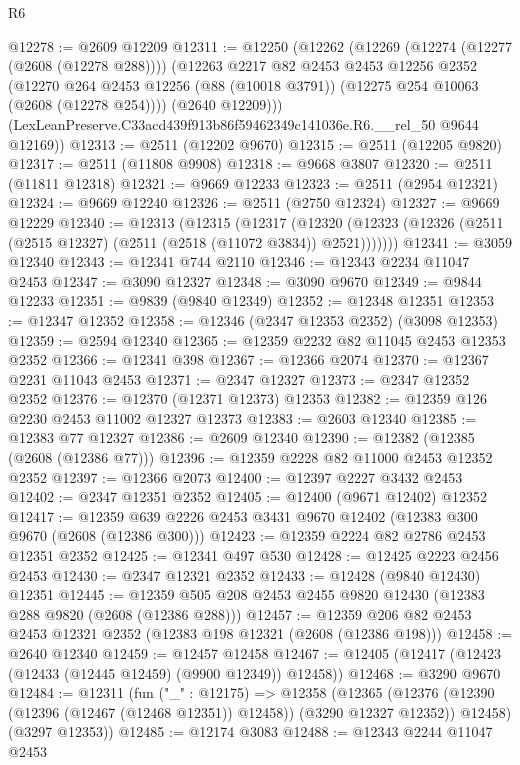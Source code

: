 \begin{lexlean}{R6}
\begin{coremodule}
@12278 := @2609 @12209
@12311 := @12250
    (@12262
      (@12269
        (@12274 (@12277 (@2608 (@12278 @288))))
        (@12263
          @2217
          @82
          @2453
          @2453
          @12256
          @2352
          (@12270 @264 @2453 @12256 (@88 (@10018 @3791)) (@12275 @254 @10063 (@2608 (@12278 @254))))
          (@2640 @12209)))
      (LexLeanPreserve.C33acd439f913b86f59462349c141036e.R6.__rel_50 @9644 @12169))
@12313 := @2511 (@12202 @9670)
@12315 := @2511 (@12205 @9820)
@12317 := @2511 (@11808 @9908)
@12318 := @9668 @3807
@12320 := @2511 (@11811 @12318)
@12321 := @9669 @12233
@12323 := @2511 (@2954 @12321)
@12324 := @9669 @12240
@12326 := @2511 (@2750 @12324)
@12327 := @9669 @12229
@12340 := @12313
    (@12315
      (@12317
        (@12320 (@12323 (@12326 (@2511 (@2515 @12327) (@2511 (@2518 (@11072 @3834)) @2521)))))))
@12341 := @3059 @12340
@12343 := @12341 @744 @2110
@12346 := @12343 @2234 @11047 @2453
@12347 := @3090 @12327
@12348 := @3090 @9670
@12349 := @9844 @12233
@12351 := @9839 (@9840 @12349)
@12352 := @12348 @12351
@12353 := @12347 @12352
@12358 := @12346 (@2347 @12353 @2352) (@3098 @12353)
@12359 := @2594 @12340
@12365 := @12359 @2232 @82 @11045 @2453 @12353 @2352
@12366 := @12341 @398
@12367 := @12366 @2074
@12370 := @12367 @2231 @11043 @2453
@12371 := @2347 @12327
@12373 := @2347 @12352 @2352
@12376 := @12370 (@12371 @12373) @12353
@12382 := @12359 @126 @2230 @2453 @11002 @12327 @12373
@12383 := @2603 @12340
@12385 := @12383 @77 @12327
@12386 := @2609 @12340
@12390 := @12382 (@12385 (@2608 (@12386 @77)))
@12396 := @12359 @2228 @82 @11000 @2453 @12352 @2352
@12397 := @12366 @2073
@12400 := @12397 @2227 @3432 @2453
@12402 := @2347 @12351 @2352
@12405 := @12400 (@9671 @12402) @12352
@12417 := @12359 @639 @2226 @2453 @3431 @9670 @12402 (@12383 @300 @9670 (@2608 (@12386 @300)))
@12423 := @12359 @2224 @82 @2786 @2453 @12351 @2352
@12425 := @12341 @497 @530
@12428 := @12425 @2223 @2456 @2453
@12430 := @2347 @12321 @2352
@12433 := @12428 (@9840 @12430) @12351
@12445 := @12359 @505 @208 @2453 @2455 @9820 @12430 (@12383 @288 @9820 (@2608 (@12386 @288)))
@12457 := @12359 @206 @82 @2453 @2453 @12321 @2352 (@12383 @198 @12321 (@2608 (@12386 @198)))
@12458 := @2640 @12340
@12459 := @12457 @12458
@12467 := @12405 (@12417 (@12423 (@12433 (@12445 @12459) (@9900 @12349)) @12458))
@12468 := @3290 @9670
@12484 := @12311
    (fun ("_" : @12175) =>
    @12358
      (@12365
        (@12376 (@12390 (@12396 (@12467 (@12468 @12351)) @12458)) (@3290 @12327 @12352))
        @12458)
      (@3297 @12353))
@12485 := @12174 @3083
@12488 := @12343 @2244 @11047 @2453

\end{coremodule}
\end{lexlean}
